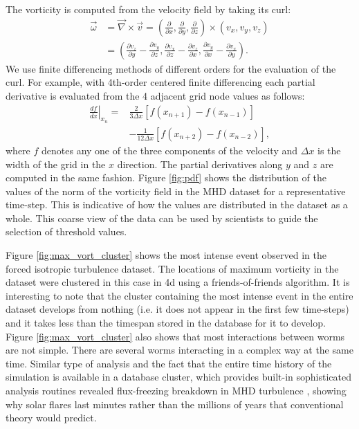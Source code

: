 \documentclass{sig-alternate}
\begin{document}
The vorticity is computed from the velocity field by taking its curl:
\begin{align}
\vec{\omega} &= \vec{\nabla} \times \vec{v} = \left( \frac{\partial}{\partial x}, \frac{\partial}{\partial y}, \frac{\partial}{\partial z} \right) 
\times \nonumber \left( v_x, v_y, v_z \right)\\
&= \left( \frac{\partial v_z}{\partial y} - \frac{\partial v_y}{\partial z}, \frac{\partial v_x}{\partial z} - \frac{\partial v_z}{\partial x}, 
\frac{\partial v_y}{\partial x} - \frac{\partial v_x}{\partial y} \right).
\label{eq:curl}
\end{align}
We use finite differencing methods of
different orders for the evaluation of the curl. For example, with 4th-order centered finite differencing each partial derivative is evaluated from the 4
adjacent grid node values as follows:  
\begin{align} 
\left.\frac{df}{dx}\right|_{x_n} = &\frac{2}{3\Delta x}[f(x_{n+1})-f(x_{n-1})]\nonumber\\ 
&-\frac{1}{12\Delta x}[f(x_{n+2})-f(x_{n-2})],
\end{align}
where $f$ denotes any one of the three components of the velocity and $\Delta x$ is the width of the grid in the $x$ direction. The partial derivatives
along $y$ and $z$ are computed in the same fashion. 
Figure \ref{fig:pdf} shows the distribution of the values of the norm of the vorticity field in the MHD dataset for a representative time-step. This is indicative 
of how the values are distributed in the dataset as a whole.
This coarse view of the data can be used by scientists to guide the selection of threshold values.

Figure \ref{fig:max_vort_cluster} shows the most intense event observed in the forced isotropic turbulence dataset. The locations of maximum vorticity in the dataset were clustered
in this case in 4d using a friends-of-friends algorithm. It is interesting to note that the cluster containing the most intense event in the entire dataset develops
from nothing (i.e. it does not appear in the first few time-steps) and it takes less than the timespan stored in the database for it to develop. 
Figure \ref{fig:max_vort_cluster} also shows that most interactions between worms are not simple. 
There are several worms interacting in a complex way at the same time. Similar type of analysis and the fact that the entire time history of the simulation
is available in a database cluster, which provides built-in sophisticated analysis routines revealed flux-freezing breakdown in MHD turbulence \cite{Eyink},
showing why solar flares last minutes rather than the millions of years that conventional theory would predict.
\end{document}
